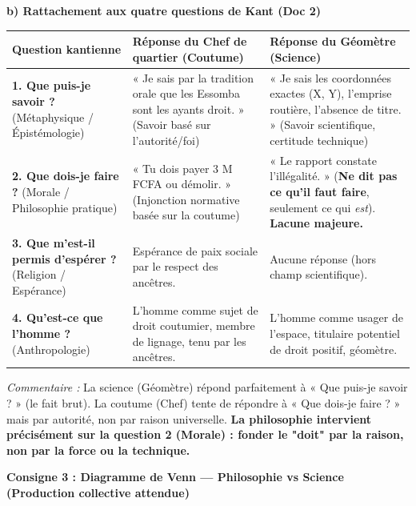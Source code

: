 \documentclass[11pt]{article}
\newcommand{\cle}[1]{{\popxbold\color{popdark}#1}}
\begin{document}
\begin{exoresolu}
\textbf{b) Rattachement aux quatre questions de Kant (Doc 2)}
\begin{center}
\begin{tabularx}{\linewidth}{|l|X|X|}\hline
\rowcolor{poppurpleL}
\textbf{Question kantienne} & \textbf{Réponse du Chef de quartier (Coutume)} & \textbf{Réponse du Géomètre (Science)} \\ \hline
\textbf{1. Que puis-je savoir ?} (Métaphysique / Épistémologie) & « Je sais par la tradition orale que les Essomba sont les ayants droit. » (Savoir basé sur l'autorité/foi) & « Je sais les coordonnées exactes (X, Y), l'emprise routière, l'absence de titre. » (\cle{Savoir scientifique}, certitude technique) \\ \hline
\textbf{2. Que dois-je faire ?} (\cle{Morale} / Philosophie pratique) & « Tu dois payer 3 M FCFA ou démolir. » (Injonction normative basée sur la coutume) & « Le rapport constate l'illégalité. » (\textbf{Ne dit pas ce qu'il faut faire}, seulement ce qui \emph{est}). \textbf{Lacune majeure.} \\ \hline
\textbf{3. Que m'est-il permis d'espérer ?} (Religion / Espérance) & Espérance de paix sociale par le respect des ancêtres. & Aucune réponse (hors champ scientifique). \\ \hline
\textbf{4. Qu'est-ce que l'homme ?} (Anthropologie) & L'homme comme \cle{sujet de droit coutumier}, membre de lignage, tenu par les ancêtres. & L'homme comme \cle{usager de l'espace}, titulaire potentiel de droit positif, géomètre. \\ \hline
\end{tabularx}
\end{center}
\emph{Commentaire :} La science (Géomètre) répond parfaitement à « Que puis-je savoir ? » (le fait brut). La coutume (Chef) tente de répondre à « Que dois-je faire ? » mais par autorité, non par raison universelle. \textbf{La philosophie intervient précisément sur la question 2 (Morale) : fonder le "doit" par la raison, non par la force ou la technique.}

\textbf{Consigne 3 : Diagramme de Venn — Philosophie vs Science (Production collective attendue)}


\end{exoresolu}
\end{document}
